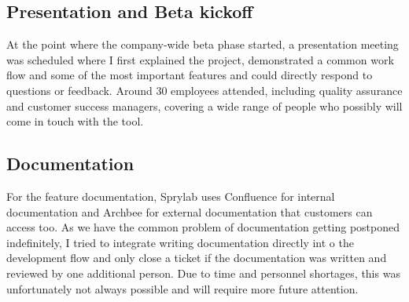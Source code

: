 \subsection{Presentation and Beta kickoff}
At the point where the company-wide beta phase started, a presentation meeting was scheduled where I first explained the project,
demonstrated a common work flow and some of the most important features and could directly respond to questions or feedback.
Around 30 employees attended, including quality assurance and customer success managers, covering a wide range of people who possibly will come in touch with the tool.

\subsection{Documentation}
For the feature documentation, Sprylab uses Confluence for internal documentation and Archbee for external documentation that customers can access too.
As we have the common problem of documentation getting postponed indefinitely, I tried to integrate writing documentation directly int o the development flow and only close a ticket if the documentation
was written and reviewed by one additional person. Due to time and personnel shortages, this was unfortunately not always possible and will require more future attention.

